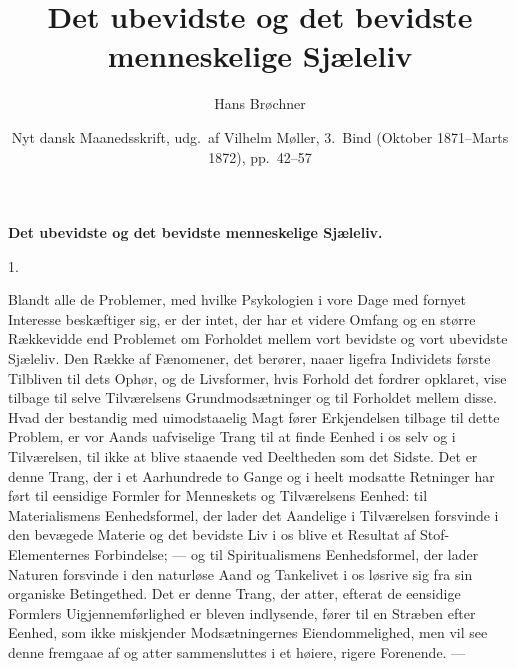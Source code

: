 \documentclass[12pt,a4paper,openany]{book}
\title{\textbf{Det ubevidste og det bevidste\\ menneskelige Sjæleliv}}
\author{Hans Brøchner}
\date{Nyt dansk Maanedsskrift, udg.\ af Vilhelm Møller,
  3.\ Bind (Oktober 1871--Marts 1872), pp.~42--57}
\newcommand{\secnum}[1]{\par\begin{center}#1\end{center}\par\nobreak}
\newcommand{\opage}[1]{\marginnote{\footnotesize\textit{[#1]}}}
\begin{document}
\maketitle
\thispagestyle{empty}
\clearpage

\opage{42}\begin{center}\textbf{\large Det ubevidste og det bevidste menneskelige Sjæleliv.}\end{center}

\secnum{1.}

Blandt alle de Problemer, med hvilke Psykologien i vore
Dage med fornyet Interesse beskæftiger sig, er der intet, der
har et videre Omfang og en større Rækkevidde end Problemet
om Forholdet mellem vort bevidste og vort ubevidste Sjæleliv.
Den Række af Fænomener, det berører, naaer ligefra Individets
første Tilbliven til dets Ophør, og de Livsformer,
hvis Forhold det fordrer opklaret, vise tilbage til selve Tilværelsens
Grundmodsætninger og til Forholdet mellem disse.
Hvad der bestandig med uimodstaaelig Magt fører Erkjendelsen
tilbage til dette Problem, er vor Aands uafviselige
Trang til at finde Eenhed i os selv og i Tilværelsen, til
ikke at blive staaende ved Deeltheden som det Sidste. Det
er denne Trang, der i et Aarhundrede to Gange og i heelt
modsatte Retninger har ført til eensidige Formler for Menneskets
og Tilværelsens Eenhed: til Materialismens Eenhedsformel,
der lader det Aandelige i Tilværelsen forsvinde i den
bevægede Materie og det bevidste Liv i os blive et Resultat
af Stof-Elementernes Forbindelse; --- og til Spiritualismens
Eenhedsformel, der lader Naturen forsvinde i den naturløse
Aand og Tankelivet i os løsrive sig fra sin organiske Betingethed.
Det er denne Trang, der atter, efterat de eensidige
Formlers Uigjennemførlighed er bleven indlysende, fører til
\opage{43}en Stræben efter Eenhed, som ikke miskjender Modsætningernes
Eiendommelighed, men vil see denne fremgaae af og atter
sammensluttes i et høiere, rigere Forenende. ---
\end{document}
